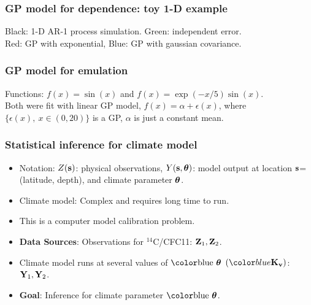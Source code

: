 \documentclass{beamer}
\begin{document}
\begin{frame}
\frametitle{GP model for dependence: toy 1-D example   }
\begin{figure}
 \end{figure}
 Black: 1-D AR-1 process simulation.  Green: independent error.\\ Red: GP with exponential, Blue: GP with gaussian covariance. 
 \end{frame}

\begin{frame}
\frametitle{GP model for emulation   }
\begin{figure}
 \end{figure}
 Functions: $ f(x) = \sin(x)$ and $f(x)=\exp(-x/5)\sin(x).$ \\
 Both were fit with linear GP model, $f(x) = \alpha + \epsilon(x)$,
 where $\{ \epsilon(x),\: x\in (0,20)\}$ is a GP, $\alpha$ is just a
 constant mean.
\end{frame}



\begin{frame}
  \frametitle{Statistical inference for climate model  }
 \begin{itemize}
	\item Notation: $Z({\bf s})$: physical observations, $Y({\bf s},\mbox{\boldmath $\theta$})$: model output at location ${\bf s}$=(latitude, depth), and climate parameter $\mbox{\boldmath $\theta$}$.
	\item Climate model: Complex and requires long time to run.
        \item This is a computer model calibration problem.
\item \textbf{Data Sources}: Observations for $^{14}$C/CFC11: ${\bf Z}_1,  {\bf Z}_2$.%
\item Climate model runs at several values of $\bluebtheta$  $(\Kv)$: ${\bf Y}_1, {\bf Y}_2$.
\item \textbf{Goal}:  Inference for climate parameter $\bluebtheta$. 
	\end{itemize}
\end{frame}
\end{document}
